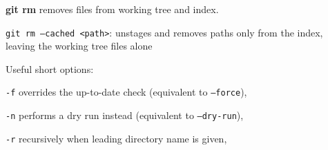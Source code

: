 %

\textbf{git rm} removes files from working tree and index.

\texttt{git rm --cached <path>}: unstages and removes paths only from the index, leaving the working tree files alone

Useful short options:
\begin{compactenum}
\item [\texttt{-f}] overrides the up-to-date check (equivalent to \texttt{--force}),
\item [\texttt{-n}] performs a dry run instead (equivalent to \texttt{--dry-run}),
\item [\texttt{-r}] recursively when leading directory name is given,
\end{compactenum}

%